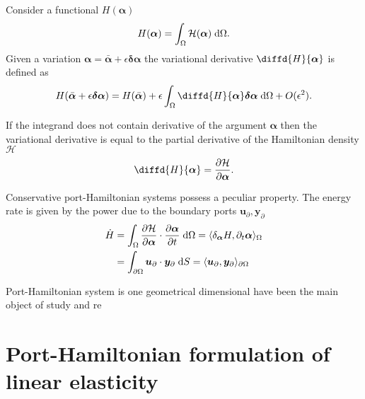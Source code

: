 \begin{definition}
Consider a functional $H(\bm{\alpha})$
\[ H(\bm{\alpha}) = \int_{\Omega} \mathcal{H}(\bm{\alpha}) \d{\Omega}.
\]
Given a variation $\bm{\alpha} = \bar{\bm{\alpha}} + \epsilon \bm{\delta\alpha}$ the variational derivative $\diffd{H}{\bm{\alpha}}$ is defined as
\[
H(\bar{\bm{\alpha}} + \epsilon \bm{\delta\alpha}) = H(\bar{\bm{\alpha}}) + \epsilon \int_{\Omega} \diffd{H}{\bm{\alpha}} \bm{\delta\alpha} \d{\Omega} + O(\epsilon^2).
\]
\end{definition}
\begin{remark}
If the integrand does not contain derivative of the argument $\bm{\alpha}$ then the variational derivative is equal to the partial derivative of the Hamiltonian density $\mathcal{H}$
\[
\diffd{H}{\bm{\alpha}} = \diffp{\mathcal{H}}{\bm{\alpha}}.
\]
\end{remark}
Conservative port-Hamiltonian systems possess a peculiar property. The energy rate is given by the power due to the boundary ports $\bm{u}_\partial, \bm{y}_\partial$
\begin{equation}
\begin{aligned}
\dot{H} &= \int_{\Omega} \diffp{\mathcal{H}}{\bm{\alpha}} \cdot \diffp{\bm{\alpha}}{t} \d{\Omega} =\inner{\dder{H}{\bm{\alpha}}}{\pder{\bm{\alpha}}{t}}{\Omega}\\
&=\int_{\partial \Omega} \bm{u}_\partial \cdot \bm{y}_\partial \d{S} =\inner{\bm{u}_\partial}{\bm{y}_\partial}{\partial \Omega}
\end{aligned}
\end{equation} 

Port-Hamiltonian system is one geometrical dimensional have been the main object of study and re


\section{Port-Hamiltonian formulation of linear elasticity}\label{sec:pHelas}






